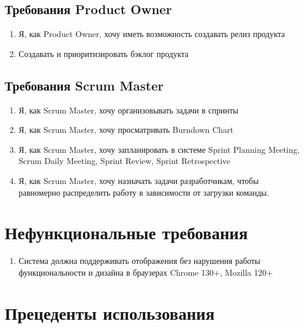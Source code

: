 \documentclass{article}
\begin{document}
\subsection{Требования Product Owner}
\begin{enumerate}[label=\textbf{POR\arabic*}.]
  \item Я, как Product Owner, хочу иметь возможность создавать релиз продукта
  \item Создавать и приоритизировать бэклог продукта
\end{enumerate}

\subsection{Требования Scrum Master}
\begin{enumerate}[label=\textbf{SMR\arabic*}.]
  \item Я, как Scrum Master, хочу организовывать задачи в спринты
  \item Я, как Scrum Master, хочу просматривать Burndown Chart
  \item Я, как Scrum Master, хочу запланировать в системе
    Sprint Planning Meeting, Scrum Daily Meeting, Sprint Review, Sprint Retrospective
  \item Я, как Scrum Master, хочу назначать задачи разработчикам, чтобы равномерно распределить работу в зависимости от загрузки команды.
\end{enumerate}


\section{Нефункциональные требования}
\begin{enumerate}[label=\textbf{NFR\arabic*}.]
  \item Система должна поддерживать отображения без нарушения работы функциональности
    и дизайна в браузерах Chrome 130+, Mozilla 120+
\end{enumerate}

\section{Прецеденты использования}
\end{document}
